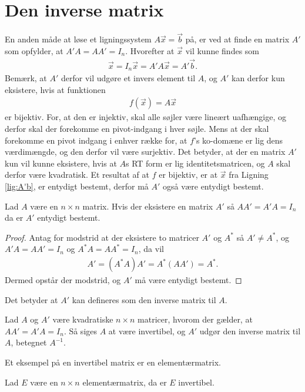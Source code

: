 \section{Den inverse matrix}
En anden måde at løse et ligningssystem $A\vec{x} = \vec{b}$ på, er ved at finde en matrix $A'$ som opfylder, at $A'A =A A' = I_n$.
Hvorefter at $\vec{x}$ vil kunne findes som
\begin{align}
\vec{x}= I_n\vec{x} = A'A\vec{x} = A'\vec{b}.
\label{lig:A'b}
\end{align}
Bemærk, at $A'$ derfor vil udgøre et invers element til $A$, og $A'$ kan derfor kun eksistere, hvis at funktionen
\begin{align*}
f(\vec{x}) = A \vec{x} 
\label{lig:funktion}
\end{align*}
er bijektiv.
For, at den er injektiv, skal alle søjler være lineært uafhængige, og derfor skal der forekomme en pivot-indgang i hver søjle.
Mens at der skal forekomme en pivot indgang i enhver række for, at $f$'s ko-domæne er lig dens værdimængde, og den derfor vil være surjektiv. 
Det betyder, at der en matrix $A'$ kun vil kunne eksistere, hvis at $A$s RT form er lig identitetsmatricen, og $A$ skal derfor være kvadratisk.
Et resultat af at $f$ er bijektiv, er at $\vec{x}$ fra Ligning \eqref{lig:A'b}, er entydigt bestemt, derfor må $A'$ også være entydigt bestemt.
\begin{stn}
Lad $A$ være en $n \times n $ matrix. Hvis der eksistere en matrix $A'$ så $AA'= A'A = I_n$ da er $A'$ entydigt bestemt.
\label{stn:entydiginvers}
\end{stn}
\begin{proof}
Antag for modstrid at der eksistere to matricer $A'$ og $A^*$ så $A' \neq A^*$, og $A'A= AA' = I_n$ og $A^*A = AA^* = I_n$, da vil
\begin{align*}
A' = (A^*A)A' = A^*(AA') = A^*.
\end{align*}
Dermed opstår der modstrid, og $A'$ må være entydigt bestemt.
\end{proof}
Det betyder at $A'$ kan defineres som den inverse matrix til $A$.
\begin{defn}
Lad $A$ og $A'$ være kvadratiske $n \times n$ matricer, hvorom der gælder, at $AA'=A'A=I_n$. 
Så siges $A$ at være invertibel, og $A'$ udgør den inverse matrix til $A$, betegnet $A^{-1}$. 
\label{def(inversmatrix)}
\end{defn}
Et eksempel på en invertibel matrix er en elementærmatrix.
\begin{lma}
Lad $E$ være en $n \times n$ elementærmatrix, da er $E$ invertibel.
\label{lma:Einvertibel}
\end{lma}
